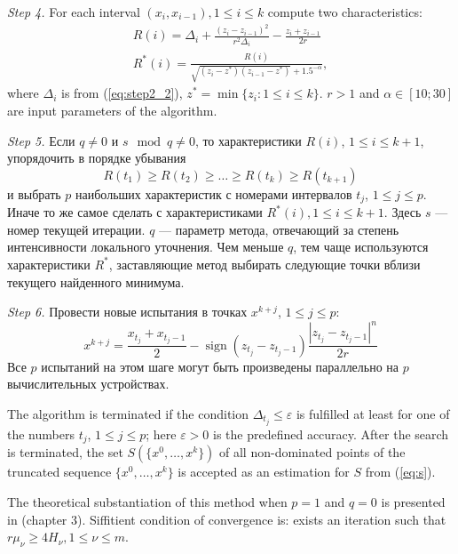 \documentclass{llncs}
\DeclareMathOperator{\sign}{sign}
\begin{document}
\textit{Step 4.} For each interval \((x_i,x_{i-1}),1\leqslant i\leqslant k\) compute two characteristics:
\begin{eqnarray}
  R(i) = \Delta_i + \frac{(z_i-z_{i-1})^2}{r^2\Delta_i}-\frac{z_i+z_{i-1}}{2r} \\
  R^*(i)=\frac{R(i)}{\sqrt{(z_i-z^*)(z_{i-1}-z^*)} + 1.5^{-\alpha}},
\end{eqnarray}
where \(\Delta_i\) is from (\ref{eq:step2_2}), \(z^*=\min\{z_i:1\leqslant i\leqslant k\}\). \(r>1\) and \(\alpha\in [10;30]\) are input parameters of the algorithm.

\textit{Step 5.} Если \(q\not=0\) и \(s \mod q\not=0 \), то характеристики \(R(i)\), \(1 \leqslant i \leqslant k + 1\), упорядочить в порядке убывания
\begin{equation*}
  R(t_1) \geqslant R(t_2) \geqslant \dots \geqslant R(t_k) \geqslant R(t_{k+1})
\end{equation*}
и выбрать \(p\) наибольших характеристик с номерами интервалов \(t_j\), \(1 \leqslant j \leqslant p\). Иначе то же самое сделать с характеристиками \(R^*(i),1\leqslant i\leqslant k+1\). Здесь \(s\) --- номер текущей итерации. \(q\) --- параметр метода, отвечающий за степень интенсивности локального уточнения. Чем меньше \(q\), тем чаще используются характеристики \(R^*\), заставляющие метод выбирать следующие точки вблизи текущего найденного минимума.

\textit{Step 6.} Провести новые испытания в точках \(x^{k+j}\), \(1 \leqslant j \leqslant p\):
\begin{equation}
  x^{k+j}=\frac{x_{t_j}+x_{t_j-1}}{2} - \sign(z_{t_j} - z_{t_j-1})\frac{|z_{t_j} - z_{t_j-1}|^n}{2r}
\end{equation}
Все \(p\) испытаний на этом шаге могут быть произведены параллельно на \(p\) вычислительных устройствах.

The algorithm is terminated if the condition \(\Delta_{t_j}\leqslant \varepsilon\) is fulfilled at least for one of the numbers \(t_j\), \(1\leqslant j\leqslant p\); here \(\varepsilon >0\) is the predefined accuracy.
After the search is terminated, the set \(S(\{x^0,\dots ,x^k\})\) of all
non-dominated points of the truncated sequence \(\{x^0,\dots ,x^k\}\) is accepted as an estimation for \(S\) from (\ref{eq:s}).

The theoretical substantiation of this method when \(p=1\) and \(q=0\) is presented in \cite{strOptBook}(chapter 3). Siffitient condition of convergence is: exists an iteration such that \(r\mu_\nu \geqslant 4H_\nu,1\leqslant \nu \leqslant m\).
\end{document}

